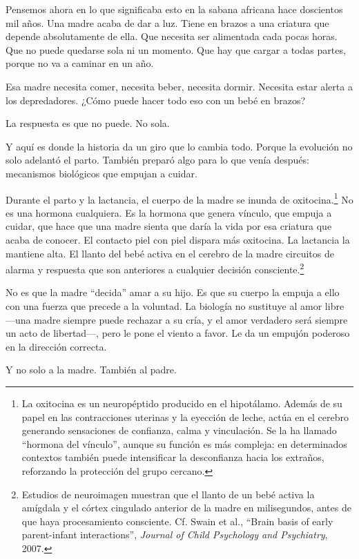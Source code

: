 Pensemos ahora en lo que significaba esto en la sabana africana hace doscientos mil años. Una madre acaba de dar a luz. Tiene en brazos a una criatura que depende absolutamente de ella. Que necesita ser alimentada cada pocas horas. Que no puede quedarse sola ni un momento. Que hay que cargar a todas partes, porque no va a caminar en un año.

Esa madre necesita comer, necesita beber, necesita dormir. Necesita estar alerta a los depredadores. ¿Cómo puede hacer todo eso con un bebé en brazos?

La respuesta es que no puede. No sola.

Y aquí es donde la historia da un giro que lo cambia todo. Porque la evolución no solo adelantó el parto. También preparó algo para lo que venía después: mecanismos biológicos que empujan a cuidar.

Durante el parto y la lactancia, el cuerpo de la madre se inunda de oxitocina.\footnote{La oxitocina es un neuropéptido producido en el hipotálamo. Además de su papel en las contracciones uterinas y la eyección de leche, actúa en el cerebro generando sensaciones de confianza, calma y vinculación. Se la ha llamado ``hormona del vínculo'', aunque su función es más compleja: en determinados contextos también puede intensificar la desconfianza hacia los extraños, reforzando la protección del grupo cercano.} No es una hormona cualquiera. Es la hormona que genera vínculo, que empuja a cuidar, que hace que una madre sienta que daría la vida por esa criatura que acaba de conocer. El contacto piel con piel dispara más oxitocina. La lactancia la mantiene alta. El llanto del bebé activa en el cerebro de la madre circuitos de alarma y respuesta que son anteriores a cualquier decisión consciente.\footnote{Estudios de neuroimagen muestran que el llanto de un bebé activa la amígdala y el córtex cingulado anterior de la madre en milisegundos, antes de que haya procesamiento consciente. Cf. Swain et al., ``Brain basis of early parent-infant interactions'', \textit{Journal of Child Psychology and Psychiatry}, 2007.}

No es que la madre ``decida'' amar a su hijo. Es que su cuerpo la empuja a ello con una fuerza que precede a la voluntad. La biología no sustituye al amor libre ---una madre siempre puede rechazar a su cría, y el amor verdadero será siempre un acto de libertad---, pero le pone el viento a favor. Le da un empujón poderoso en la dirección correcta.

Y no solo a la madre. También al padre.

